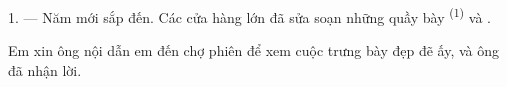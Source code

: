 %
%
%
%
%

\VUsaut{4.0mm}
\VUsaut{2.0mm}
\VUsaut{3.4mm}

1. --- Năm mới sắp đến. Các cửa hàng lớn đã sửa soạn những quầy bày 
\textsuperscript{(1)} và .

Em xin ông nội dẫn em đến chợ phiên để xem cuộc trưng bày đẹp đẽ ấy, và ông đã nhận lời.

